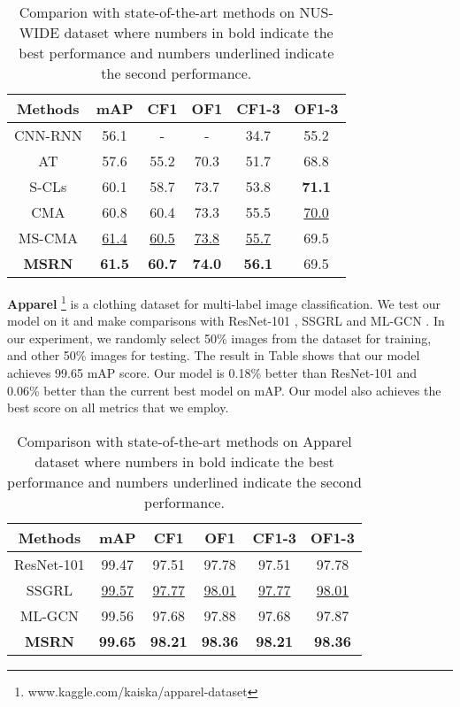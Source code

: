 \documentclass{article} \usepackage{nips14submit_e,times}
\begin{document}
\begin{table}[h] \centering \small
\caption{Comparion with state-of-the-art methods on NUS-WIDE dataset where numbers in bold indicate the best performance and numbers underlined indicate the second performance.}
\label{table:nuswide}
\begin{tabular}{c|ccccc}
\hline
Methods & mAP & CF1 & OF1 & CF1-3 & OF1-3 \\ \hline
CNN-RNN\cite{CVPR2016:ULMIC} & 56.1 & - & - & 34.7 & 55.2\\
AT\cite{ICLR2017:AT} & 57.6 & 55.2 & 70.3 & 51.7 & 68.8\\
S-CLs\cite{CVPR2018:KDWD} & 60.1 & 58.7 & 73.7 & 53.8 & \textbf{71.1} \\
CMA\cite{AAAI2020:CMA} & {60.8} & {60.4} & {73.3} & {55.5} & \underline{70.0} \\
MS-CMA\cite{AAAI2020:CMA} & \underline{61.4} & \underline{60.5} & \underline{73.8} & \underline{55.7} & {69.5} \\
\textbf{MSRN} & \textbf{61.5} & \textbf{60.7} & \textbf{74.0} & \textbf{56.1} & {69.5}\\ \hline
\end{tabular}
\end{table}


\noindent\textbf{Apparel} \footnote{www.kaggle.com/kaiska/apparel-dataset} is a
clothing dataset for multi-label image classification.
We test our model on it and make comparisons with ResNet-101 \cite{ResNet}, SSGRL \cite{ICCV2019:ssgrl} and ML-GCN \cite{CVPR2019:ML-GCN}.
In our experiment, we randomly select 50\% images from the dataset for training, and other 50\% images for testing.
The result in Table  shows that our model achieves 99.65 mAP score.
Our model is 0.18\% better than ResNet-101 and 0.06\% better than the current best model on mAP.
Our model also achieves the best score on all metrics that we employ.
\begin{table}[h]
\caption{Comparison with state-of-the-art methods on Apparel dataset where numbers in bold indicate the best performance and numbers underlined indicate the second performance.}
\label{table:apparel}
\centering \small
\begin{tabular}{c|ccccc}
\hline
Methods & mAP & CF1 & OF1 & CF1-3 & OF1-3 \\ \hline
ResNet-101\cite{ResNet} & 99.47 & 97.51 & 97.78 & 97.51 & 97.78\\
SSGRL\cite{ICCV2019:ssgrl} & \underline{99.57} & \underline{97.77} & \underline{98.01} & \underline{97.77} & \underline{98.01}\\
ML-GCN\cite{CVPR2019:ML-GCN} & {99.56}  & 97.68 & 97.88 & 97.68 & {97.87} \\
\textbf{MSRN} & \textbf{99.65} & \textbf{98.21} & \textbf{98.36} & \textbf{98.21} & \textbf{98.36}\\ \hline
\end{tabular}

\end{table}
\end{document}
